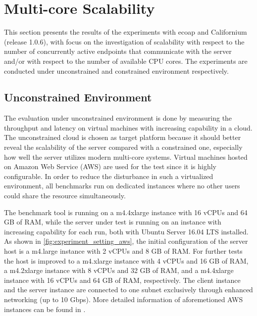 
\section{Multi-core Scalability} \label{multi_core_scalability}

This section presents the results of the experiments with ecoap and Californium (release 1.0.6), with focus on the investigation of scalability with respect to the number of concurrently active endpoints that communicate with the server and/or with respect to the number of available CPU cores. The experiments are conducted under unconstrained and constrained environment respectively. 

\subsection{Unconstrained Environment}

The evaluation under unconstrained environment is done by measuring the throughput and latency on virtual machines with increasing capability in a cloud. The unconstrained cloud is chosen as target platform because it should better reveal the scalability of the server compared with a constrained one, especially how well the server utilizes modern multi-core systems. Virtual machines hosted on Amazon Web Service (AWS) are used for the test since it is highly configurable. In order to reduce the disturbance in such a virtualized environment, all benchmarks run on dedicated instances \autocite{aws_dedicated_instance} where no other users could share the resource simultaneously. 

The benchmark tool is running on a m4.4xlarge instance with 16 vCPUs and 64 GB of RAM, while the server under test is running on an instance with increasing capability for each run, both with Ubuntu Server 16.04 LTS installed. As shown in \autoref{fig:experiment_setting_aws}, the initial configuration of the server host is a m4.large instance with 2 vCPUs and 8 GB of RAM. For further tests the host is improved to a m4.xlarge instance with 4 vCPUs and 16 GB of RAM, a m4.2xlarge instance with 8 vCPUs and 32 GB of RAM, and a m4.4xlarge instance with 16 vCPUs and 64 GB of RAM, respectively. The client instance and the server instance are connected to one subnet exclusively through enhanced networking (up to 10 Gbps). More detailed information of aforemetioned AWS instances can be found in \autocite{aws_instance}.

